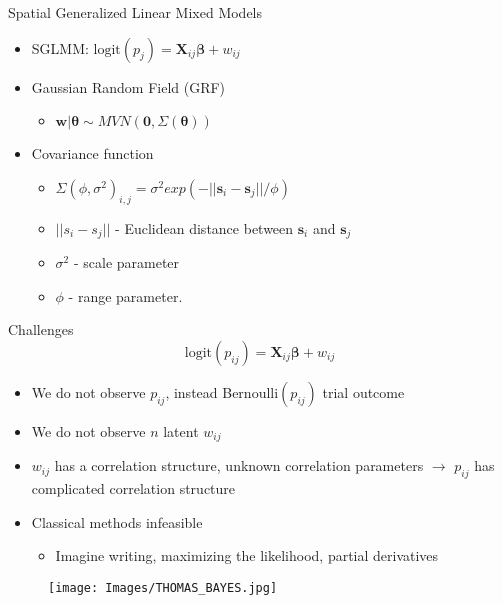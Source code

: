 \documentclass{beamer}
\begin{document}
\begin{frame}{Spatial Generalized Linear Mixed Models}{} %
\begin{itemize}
\addtolength{\itemsep}{0.5\baselineskip}

\item SGLMM: $\text{logit}(p_{j}) = \pmb{X}_{ij} \pmb{\beta} + w_{ij}$
\item Gaussian Random Field (GRF)
  \begin{itemize}
  \item $\pmb{w} | \pmb{\theta} \sim MVN(\pmb{0}, \Sigma(\pmb{\theta}))$
  \end{itemize}

\item Covariance function
  \begin{itemize}
  \addtolength{\itemsep}{0.5\baselineskip}
  \item $ \Sigma(\phi, \sigma^{2})_{i,j} = \sigma^{2} exp(-||\pmb{s}_{i} - \pmb{s}_{j}||/\phi) $

  \item $||s_{i} - s_{j}||$ - Euclidean distance between $\pmb{s}_{i}$ and $\pmb{s}_{j}$
  \item $\sigma^{2}$ - scale parameter
  \item $\phi$ - range parameter.
  \end{itemize}
\end{itemize}
\end{frame}

\begin{frame}{Challenges} %
$$ \text{logit}(p_{ij}) = \pmb{X}_{ij} \pmb{\beta} + w_{ij}$$
\begin{itemize} 
\addtolength{\itemsep}{0.5\baselineskip}
\item We do not observe $p_{ij}$, instead Bernoulli$(p_{ij})$ trial outcome
\item We do not observe $n$ latent $w_{ij}$
\item $w_{ij}$ has a correlation structure, unknown correlation parameters $\rightarrow$ $p_{ij}$ has complicated correlation structure

\item Classical methods infeasible
  \begin{itemize}
  \item Imagine writing, maximizing the likelihood, partial derivatives
  \end{itemize}
\end{itemize}

  \begin{figure}[H]
	\centering
	\texttt{[image: Images/THOMAS\_BAYES.jpg]}
	\end{figure}

\end{frame}
\end{document}
